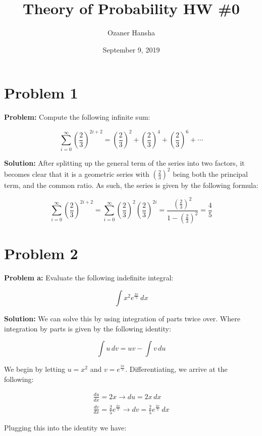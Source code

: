 \documentclass{article}
\begin{document}
\title{Theory of Probability HW \#0}
\author{Ozaner Hansha}
\date{September 9, 2019}
\maketitle

\newcommand*\Eval[3]{\left[#1\right]_{#2}^{#3}}

\section*{Problem 1}
\noindent\textbf{Problem:} Compute the following infinite sum:

$$\sum_{i=0}^\infty\left(\frac{2}{3}\right)^{2i+2}=\left(\frac{2}{3}\right)^2+\left(\frac{2}{3}\right)^4+\left(\frac{2}{3}\right)^6+\cdots$$

\noindent\textbf{Solution:} After splitting up the general term of the series into two factors, it becomes clear that it is a geometric series with $\left(\frac{2}{3}\right)^2$ being both the principal term, and the common ratio. As such, the series is given by the following formula:

$$\sum_{i=0}^\infty\left(\frac{2}{3}\right)^{2i+2}=\sum_{i=0}^\infty\left(\frac{2}{3}\right)^2\left(\frac{2}{3}\right)^{2i}=\frac{\left(\frac{2}{3}\right)^2}{1-\left(\frac{2}{3}\right)^2}=\frac{4}{5}$$

\section*{Problem 2}
\noindent\textbf{Problem a:} Evaluate the following indefinite integral:

$$\int x^2e^{\frac{2x}{5}}\, dx$$

\noindent\textbf{Solution:} We can solve this by using integration of parts twice over. Where integration by parts is given by the following identity:

$$\int u\,dv=uv-\int v\,du$$

We begin by letting $u=x^2$ and $v=e^{\frac{2x}{5}}$. Differentiating, we arrive at the following:

\begin{gather*}
    \frac{du}{dx}=2x\rightarrow du=2x\,dx\\
    \frac{dv}{dx}=\frac{2}{5}e^{\frac{2x}{5}}\rightarrow dv=\frac{2}{5}e^{\frac{2x}{5}}\,dx
\end{gather*}

Plugging this into the identity we have:
\end{document}
